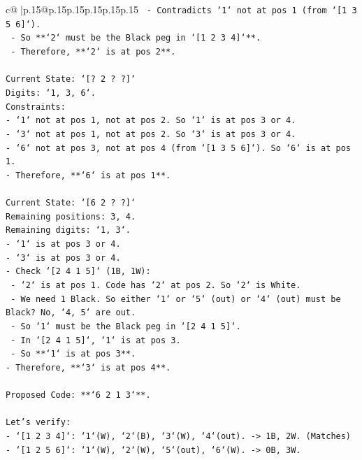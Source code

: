 \documentclass{article}
\begin{document}
{\begin{supertabular}{c@{$\;$}|p{.15\linewidth}@{}p{.15\linewidth}p{.15\linewidth}p{.15\linewidth}p{.15\linewidth}p{.15\linewidth}}
{{{\texttt{        {-} Contradicts `1` not at pos 1 (from `{[}1 3 5 6{]}`).} \\
\texttt{    {-} So **`2` must be the Black peg in `{[}1 2 3 4{]}`**.} \\
\texttt{    {-} Therefore, **`2` is at pos 2**.} \\
\\ 
\texttt{Current State: `{[}? 2 ? ?{]}`} \\
\texttt{Digits: `1, 3, 6`.} \\
\texttt{Constraints:} \\
\texttt{{-} `1` not at pos 1, not at pos 2. So `1` is at pos 3 or 4.} \\
\texttt{{-} `3` not at pos 1, not at pos 2. So `3` is at pos 3 or 4.} \\
\texttt{{-} `6` not at pos 3, not at pos 4 (from `{[}1 3 5 6{]}`). So `6` is at pos 1.} \\
\texttt{{-} Therefore, **`6` is at pos 1**.} \\
\\ 
\texttt{Current State: `{[}6 2 ? ?{]}`} \\
\texttt{Remaining positions: 3, 4.} \\
\texttt{Remaining digits: `1, 3`.} \\
\texttt{{-} `1` is at pos 3 or 4.} \\
\texttt{{-} `3` is at pos 3 or 4.} \\
\texttt{{-} Check `{[}2 4 1 5{]}` (1B, 1W):} \\
\texttt{    {-} `2` is at pos 1. Code has `2` at pos 2. So `2` is White.} \\
\texttt{    {-} We need 1 Black. So either `1` or `5` (out) or `4` (out) must be Black? No, `4, 5` are out.} \\
\texttt{    {-} So `1` must be the Black peg in `{[}2 4 1 5{]}`.} \\
\texttt{    {-} In `{[}2 4 1 5{]}`, `1` is at pos 3.} \\
\texttt{    {-} So **`1` is at pos 3**.} \\
\texttt{{-} Therefore, **`3` is at pos 4**.} \\
\\ 
\texttt{Proposed Code: **`6 2 1 3`**.} \\
\\ 
\texttt{Let's verify:} \\
\texttt{{-} `{[}1 2 3 4{]}`: `1`(W), `2`(B), `3`(W), `4`(out). {-}> 1B, 2W. (Matches)} \\
\texttt{{-} `{[}1 2 5 6{]}`: `1`(W), `2`(W), `5`(out), `6`(W). {-}> 0B, 3W.} \\
}}}
\end{supertabular}}
\end{document}
